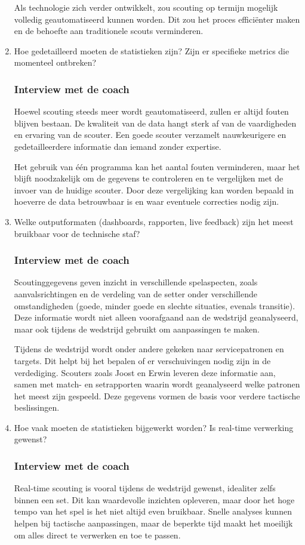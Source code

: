 \begin{enumerate}
  Als technologie zich verder ontwikkelt, zou scouting op termijn mogelijk volledig geautomatiseerd kunnen worden. Dit zou het proces efficiënter maken en de behoefte aan traditionele scouts verminderen.
  \item Hoe gedetailleerd moeten de statistieken zijn? Zijn er specifieke metrics die momenteel ontbreken?
  \subsubsection{Interview met de coach}
  Hoewel scouting steeds meer wordt geautomatiseerd, zullen er altijd fouten blijven bestaan. De kwaliteit van de data hangt sterk af van de vaardigheden en ervaring van de scouter. Een goede scouter verzamelt nauwkeurigere en gedetailleerdere informatie dan iemand zonder expertise.

  Het gebruik van één programma kan het aantal fouten verminderen, maar het blijft noodzakelijk om de gegevens te controleren en te vergelijken met de invoer van de huidige scouter. Door deze vergelijking kan worden bepaald in hoeverre de data betrouwbaar is en waar eventuele correcties nodig zijn.
  \item Welke outputformaten (dashboards, rapporten, live feedback) zijn het meest bruikbaar voor de technische staf?
  \subsubsection{Interview met de coach}
  Scoutinggegevens geven inzicht in verschillende spelaspecten, zoals aanvalsrichtingen en de verdeling van de setter onder verschillende omstandigheden (goede, minder goede en slechte situaties, evenals transitie). Deze informatie wordt niet alleen voorafgaand aan de wedstrijd geanalyseerd, maar ook tijdens de wedstrijd gebruikt om aanpassingen te maken.

  Tijdens de wedstrijd wordt onder andere gekeken naar servicepatronen en targets. Dit helpt bij het bepalen of er verschuivingen nodig zijn in de verdediging. Scouters zoals Joost en Erwin leveren deze informatie aan, samen met match- en setrapporten waarin wordt geanalyseerd welke patronen het meest zijn gespeeld. Deze gegevens vormen de basis voor verdere tactische beslissingen.
  \item Hoe vaak moeten de statistieken bijgewerkt worden? Is real-time verwerking gewenst?
  \subsubsection{Interview met de coach}
  Real-time scouting is vooral tijdens de wedstrijd gewenst, idealiter zelfs binnen een set. Dit kan waardevolle inzichten opleveren, maar door het hoge tempo van het spel is het niet altijd even bruikbaar. Snelle analyses kunnen helpen bij tactische aanpassingen, maar de beperkte tijd maakt het moeilijk om alles direct te verwerken en toe te passen.
\end{enumerate}

